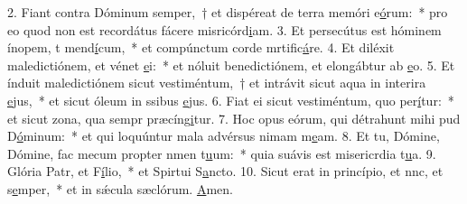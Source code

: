 2. Fiant contra Dóminum semper,~† et dispéreat de terra memóri e\uline{ó}rum:~* pro eo quod non est recordátus fácere misricórd\uline{i}am.
3. Et persecútus est hóminem ínopem, t mend\uline{í}cum,~* et compúnctum corde mrtific\uline{á}re.
4. Et diléxit maledictiónem, et vénet \uline{e}i:~* et nóluit benedictiónem, et elongábtur ab \uline{e}o.
5. Et índuit maledictiónem sicut vestiméntum,~† et intrávit sicut aqua in interira \uline{e}jus,~* et sicut óleum in ssibus \uline{e}jus.
6. Fiat ei sicut vestiméntum, quo per\uline{í}tur:~* et sicut zona, qua sempr præcíng\uline{i}tur.
7. Hoc opus eórum, qui détrahunt mihi pud D\uline{ó}minum:~* et qui loquúntur mala advérsus nimam m\uline{e}am.
8. Et tu, Dómine, Dómine, fac mecum propter nmen t\uline{u}um:~* quia suávis est misericrdia t\uline{u}a.
9. Glória Patr, et F\uline{í}lio,~* et Spirtui S\uline{a}ncto.
10. Sicut erat in princípio, et nnc, et s\uline{e}mper,~* et in sǽcula sæclórum. \uline{A}men.
